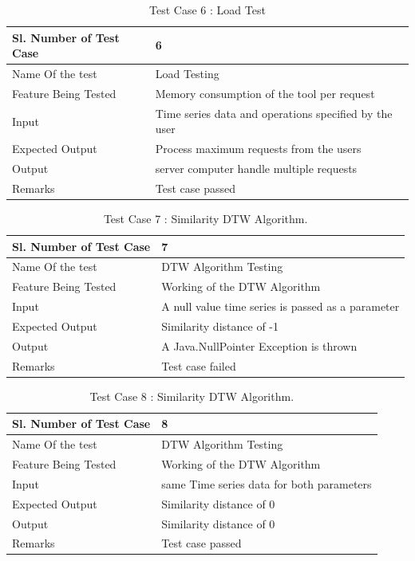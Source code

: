 \documentclass[12pt,a4paper]{report}
\begin{document}
\begin{table}
    \begin{tabular}{|l|l|}
    \hline
    Sl. Number of Test Case & 6                             \\ \hline
    Name Of the test        & Load Testing               \\ \hline
    Feature Being Tested    & Memory consumption of the tool per request\\ \hline
    Input                   & Time series data and operations specified by the user  \\ \hline
    Expected Output         & Process maximum requests from the users \\ \hline
    Output                  & server computer handle multiple requests \\ \hline
    Remarks                 & Test case passed              \\ \hline
    \end{tabular}
    \caption {Test Case 6 : Load Test}
\end{table}

\begin{table}
    \begin{tabular}{|l|l|}
    \hline
    Sl. Number of Test Case & 7                             \\ \hline
    Name Of the test        & DTW Algorithm Testing        \\ \hline
    Feature Being Tested    & Working of the DTW Algorithm \\ \hline
    Input                   & A null value time series is passed as a parameter\\ \hline
    Expected Output         & Similarity distance of -1 \\ \hline
    Output                  & A Java.NullPointer Exception is thrown \\ \hline
    Remarks                 & Test case failed              \\ \hline
    \end{tabular}
    \caption {Test Case 7 : Similarity DTW Algorithm.}
\end{table}
\begin{table}
    \begin{tabular}{|l|l|}
    \hline
    Sl. Number of Test Case & 8                            \\ \hline
    Name Of the test        & DTW Algorithm Testing        \\ \hline
    Feature Being Tested    & Working of the DTW Algorithm \\ \hline
    Input                   & same Time series data for both parameters\\ \hline
    Expected Output         & Similarity distance of 0 \\ \hline
    Output                  & Similarity distance of 0 \\ \hline
    Remarks                 & Test case passed              \\ \hline
    \end{tabular}
    \caption {Test Case 8 : Similarity DTW Algorithm.}
\end{table}
\end{document}
